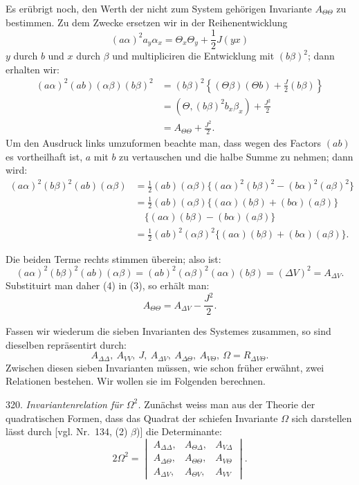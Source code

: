 \documentclass[11pt]{article}
\providecommand{\weberpage}[1]{}
\providecommand{\weq}[2]{\begin{equation}\tag{#1}#2\end{equation}}
\let\Delta\varDelta
\let\Theta\varTheta
\let\Omega\varOmega
\begin{document}
Es erübrigt noch, den Werth der nicht zum System gehörigen Invariante
$A_{\Theta\Theta}$ zu bestimmen. Zu dem Zwecke ersetzen wir in der
Reihenentwicklung
\[
(a\alpha)^2a_y\alpha_x = \Theta_x\Theta_y + \frac{1}{2}J(yx)
\]
$y$ durch $b$ und $x$ durch $\beta$ und multipliciren die Entwicklung
mit $(b\beta)^2$; dann erhalten wir:
\weq{3}{
\begin{aligned}
(a\alpha)^2(ab)(\alpha\beta)(b\beta)^2 &= (b\beta)^2\left\{(\Theta\beta)(\Theta b) + \frac{J}{2}(b\beta)\right\}\\
&= \left(\Theta, (b\beta)^2b_x\beta_x\right) + \frac{J^2}{2}\\
&= A_{\Theta\Theta} + \frac{J^2}{2}.
\end{aligned}
}
Um den Ausdruck links umzuformen beachte man, dass wegen des Factors
$(ab)$ es vortheilhaft ist, $a$ mit $b$ zu vertauschen und die halbe
Summe zu nehmen; dann wird:
\[
\begin{aligned}
(a\alpha)^2(b\beta)^2(ab)(\alpha\beta) &= \frac{1}{2}(ab)(\alpha\beta)\{(a\alpha)^2(b\beta)^2 - (b\alpha)^2(a\beta)^2\}\\
&= \frac{1}{2}(ab)(\alpha\beta)\{(a\alpha)(b\beta) + (b\alpha)(a\beta)\}\\
&\quad \{(a\alpha)(b\beta) - (b\alpha)(a\beta)\}\\
&= \frac{1}{2}(ab)^2(\alpha\beta)^2\{(a\alpha)(b\beta) + (b\alpha)(a\beta)\}.
\end{aligned}
\]


\weberpage{344}
Die beiden Terme rechts stimmen überein; also ist:
\weq{4}{(a\alpha)^2(b\beta)^2(ab)(\alpha\beta) = (ab)^2(\alpha\beta)^2(a\alpha)(b\beta) = (\Delta V)^2 = A_{\Delta V}.}
Substituirt man daher (4) in (3), so erhält man:
\weq{5}{A_{\Theta\Theta} = A_{\Delta V} - \frac{J^2}{2}.}

Fassen wir wiederum die sieben Invarianten des Systemes zusammen, so
sind dieselben repräsentirt durch:
\[
A_{\Delta\Delta}, \ A_{VV}, \ J, \ A_{\Delta V}, \ A_{\Delta\Theta}, \ A_{V\Theta}, \ \Omega = R_{\Delta V\Theta}.
\]
Zwischen diesen sieben Invarianten müssen, wie schon früher erwähnt,
zwei Relationen bestehen. Wir wollen sie im Folgenden berechnen.

320. \textit{Invariantenrelation für $\Omega^2$.} Zunächst weiss man aus
der Theorie der quadratischen Formen, dass das Quadrat der schiefen
Invariante $\Omega$ sich darstellen lässt durch [vgl. Nr.\ 134, (2)
$\beta$)] die Determinante:
\[
2\Omega^2 = \begin{vmatrix}
A_{\Delta\Delta}, & A_{\Theta\Delta}, & A_{V\Delta} \\
A_{\Delta\Theta}, & A_{\Theta\Theta}, & A_{V\Theta} \\
A_{\Delta V}, & A_{\Theta V}, & A_{VV}
\end{vmatrix}.
\]
\end{document}

